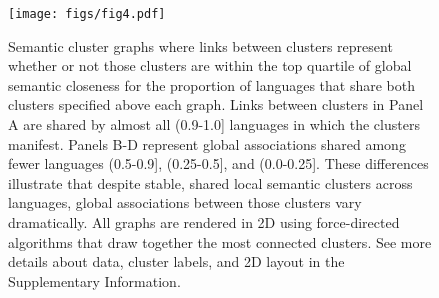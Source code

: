 \documentclass[9pt,twocolumn,twoside,lineno]{pnas-new}
\begin{document}


\begin{figure}[t!]
\centering
\texttt{[image: figs/fig4.pdf]}
\caption{Semantic cluster graphs where links between clusters represent whether or not those clusters are within the top quartile of global semantic closeness for the proportion of languages that share both clusters specified above each graph. Links between clusters in Panel A are shared by almost all (0.9-1.0] languages in which the clusters manifest. Panels B-D represent global associations shared among fewer languages (0.5-0.9], (0.25-0.5], and (0.0-0.25]. These differences illustrate that despite stable, shared local semantic clusters across languages, global associations between those clusters vary dramatically. All graphs are rendered in 2D using force-directed algorithms that draw together the most connected clusters. See more details about data, cluster labels, and 2D layout in the Supplementary Information.}
\label{fig:fig4} 
\end{figure}
\end{document}
